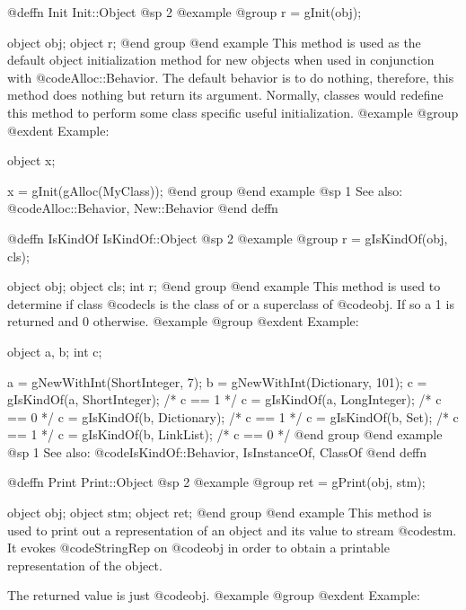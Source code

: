 @deffn {Init} Init::Object
@sp 2
@example
@group
r = gInit(obj);

object  obj;
object  r;
@end group
@end example
This method is used as the default object initialization method for new
objects when used in conjunction with @code{Alloc::Behavior}.  The
default behavior is to do nothing, therefore, this method does nothing
but return its argument.  Normally, classes would redefine this method
to perform some class specific useful initialization.
@example
@group
@exdent Example:

object  x;

x = gInit(gAlloc(MyClass));
@end group
@end example
@sp 1
See also:  @code{Alloc::Behavior, New::Behavior}
@end deffn














@deffn {IsKindOf} IsKindOf::Object
@sp 2
@example
@group
r = gIsKindOf(obj, cls);

object  obj;
object  cls;
int     r;
@end group
@end example
This method is used to determine if class @code{cls} is the class of
or a superclass of @code{obj}.  If so a 1 is returned and 0 otherwise.
@example
@group
@exdent Example:

object  a, b;
int     c;

a = gNewWithInt(ShortInteger, 7);
b = gNewWithInt(Dictionary, 101);
c = gIsKindOf(a, ShortInteger);  /* c == 1  */
c = gIsKindOf(a, LongInteger);   /* c == 0  */
c = gIsKindOf(b, Dictionary);    /* c == 1  */
c = gIsKindOf(b, Set);           /* c == 1  */
c = gIsKindOf(b, LinkList);      /* c == 0  */
@end group
@end example
@sp 1
See also:  @code{IsKindOf::Behavior, IsInstanceOf, ClassOf}
@end deffn












@deffn {Print} Print::Object
@sp 2
@example
@group
ret = gPrint(obj, stm);

object  obj;
object  stm;
object  ret;
@end group
@end example
This method is used to print out a representation of an object
and its value to stream @code{stm}.  It evokes @code{StringRep}
on @code{obj} in order to obtain a printable representation of
the object.

The returned value is just @code{obj}.
@example
@group
@exdent Example:

